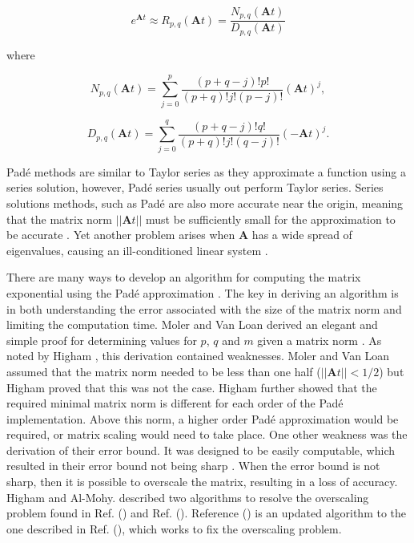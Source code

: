 \begin{equation}
    e^{\boldsymbol{A}t} \approx R_{p,q}(\boldsymbol{A}t) = \frac{N_{p,q}(\boldsymbol{A}t)}{D_{p,q}(\boldsymbol{A}t)}
    \label{eq:padeApprox}
\end{equation}

\noindent where

\begin{equation}
    N_{p,q}(\boldsymbol{A}t) = \sum_{j=0}^{p}\frac{(p + q - j)!p!}{(p + q)!j!(p - j)!}(\boldsymbol{A}t)^{j},
\end{equation}

\begin{equation}
    D_{p,q}(\boldsymbol{A}t) = \sum_{j=0}^{q}\frac{(p + q - j)!q!}{(p + q)!j!(q - j)!}(-\boldsymbol{A}t)^{j}.
\end{equation}

Pad\'e methods are similar to Taylor series as they approximate a function using a series solution, however, Pad\'e series usually out perform Taylor series. Series solutions methods, such as Pad\'e are also more accurate near the origin, meaning that the matrix norm $||\boldsymbol{A}t||$ must be sufficiently small for the approximation to be accurate \cite{pusa2010}. Yet another problem arises when $\boldsymbol{A}$ has a wide spread of eigenvalues, causing an ill-conditioned linear system  \cite{exokit} \cite{moler2003}. 

There are many ways to develop an algorithm for computing the matrix exponential using the Pad\'e approximation \cite{exokit} \cite{higham2005} \cite{higham2009}. The key in deriving an algorithm is in both understanding the error associated with the size of the matrix norm and limiting the computation time. Moler and Van Loan derived an elegant and simple proof for determining values for $p$, $q$ and $m$ given a matrix norm \cite{moler2003}. As noted by Higham \cite{higham2005}, this derivation contained weaknesses. Moler and Van Loan assumed that the matrix norm needed to be less than one half ($||\boldsymbol{A}t|| < 1/2$) but Higham proved that this was not the case. Higham further showed that the required minimal matrix norm is different for each order of the Pad\'e implementation. Above this norm, a higher order Pad\'e approximation would be required, or matrix scaling would need to take place. One other weakness was the derivation of their error bound. It was designed to be easily computable, which resulted in their error bound not being sharp \cite{higham2005}. When the error bound is not sharp, then it is possible to overscale the matrix, resulting in a loss of accuracy. Higham and Al-Mohy. described two algorithms to resolve the overscaling problem found in Ref. (\cite{higham2005}) and  Ref. (\cite{higham2009}). Reference (\cite{higham2009}) is an updated algorithm to the one described in Ref. (\cite{higham2005}), which works to fix the overscaling problem.



